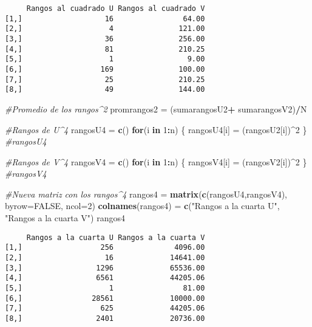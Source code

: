 \documentclass[
  a4paper,
  oneside,
  openany]{book}
\newenvironment{Shaded}{\begin{snugshade}}{\end{snugshade}}
\newcommand{\CommentTok}[1]{\textcolor[rgb]{0.56,0.35,0.01}{\textit{#1}}}
\newcommand{\ControlFlowTok}[1]{\textcolor[rgb]{0.13,0.29,0.53}{\textbf{#1}}}
\newcommand{\DataTypeTok}[1]{\textcolor[rgb]{0.13,0.29,0.53}{#1}}
\newcommand{\DecValTok}[1]{\textcolor[rgb]{0.00,0.00,0.81}{#1}}
\newcommand{\KeywordTok}[1]{\textcolor[rgb]{0.13,0.29,0.53}{\textbf{#1}}}
\newcommand{\NormalTok}[1]{#1}
\newcommand{\OperatorTok}[1]{\textcolor[rgb]{0.81,0.36,0.00}{\textbf{#1}}}
\newcommand{\OtherTok}[1]{\textcolor[rgb]{0.56,0.35,0.01}{#1}}
\newcommand{\StringTok}[1]{\textcolor[rgb]{0.31,0.60,0.02}{#1}}
\begin{document}
\begin{verbatim}
     Rangos al cuadrado U Rangos al cuadrado V
[1,]                   16                64.00
[2,]                    4               121.00
[3,]                   36               256.00
[4,]                   81               210.25
[5,]                    1                 9.00
[6,]                  169               100.00
[7,]                   25               210.25
[8,]                   49               144.00
\end{verbatim}

\begin{Shaded}
\begin{Highlighting}[]
\CommentTok{\#Promedio de los rangos\^{}2}
\NormalTok{promrangos2 =}\StringTok{ }\NormalTok{(sumarangosU2}\OperatorTok{+}\StringTok{ }\NormalTok{sumarangosV2)}\OperatorTok{/}\NormalTok{N}

\CommentTok{\#Rangos de U\^{}4}
\NormalTok{rangosU4 =}\StringTok{ }\KeywordTok{c}\NormalTok{()}
\ControlFlowTok{for}\NormalTok{(i }\ControlFlowTok{in} \DecValTok{1}\OperatorTok{:}\NormalTok{n) \{}
\NormalTok{  rangosU4[i] =}\StringTok{ }\NormalTok{(rangosU2[i])}\OperatorTok{\^{}}\DecValTok{2}
\NormalTok{\}}
\CommentTok{\#rangosU4}

\CommentTok{\#Rangos de V\^{}4}
\NormalTok{rangosV4 =}\StringTok{ }\KeywordTok{c}\NormalTok{()}
\ControlFlowTok{for}\NormalTok{(i }\ControlFlowTok{in} \DecValTok{1}\OperatorTok{:}\NormalTok{n) \{}
\NormalTok{  rangosV4[i] =}\StringTok{ }\NormalTok{(rangosV2[i])}\OperatorTok{\^{}}\DecValTok{2}
\NormalTok{\}}
\CommentTok{\#rangosV4}

\CommentTok{\#Nueva matriz con los rangos\^{}4}
\NormalTok{rangos4 =}\StringTok{ }\KeywordTok{matrix}\NormalTok{(}\KeywordTok{c}\NormalTok{(rangosU4,rangosV4), }\DataTypeTok{byrow=}\OtherTok{FALSE}\NormalTok{, }\DataTypeTok{ncol=}\DecValTok{2}\NormalTok{)}
\KeywordTok{colnames}\NormalTok{(rangos4) =}\StringTok{ }\KeywordTok{c}\NormalTok{(}\StringTok{"Rangos a la cuarta U"}\NormalTok{, }\StringTok{"Rangos a la cuarta V"}\NormalTok{)}
\NormalTok{rangos4}
\end{Highlighting}
\end{Shaded}

\begin{verbatim}
     Rangos a la cuarta U Rangos a la cuarta V
[1,]                  256              4096.00
[2,]                   16             14641.00
[3,]                 1296             65536.00
[4,]                 6561             44205.06
[5,]                    1                81.00
[6,]                28561             10000.00
[7,]                  625             44205.06
[8,]                 2401             20736.00
\end{verbatim}
\end{document}
